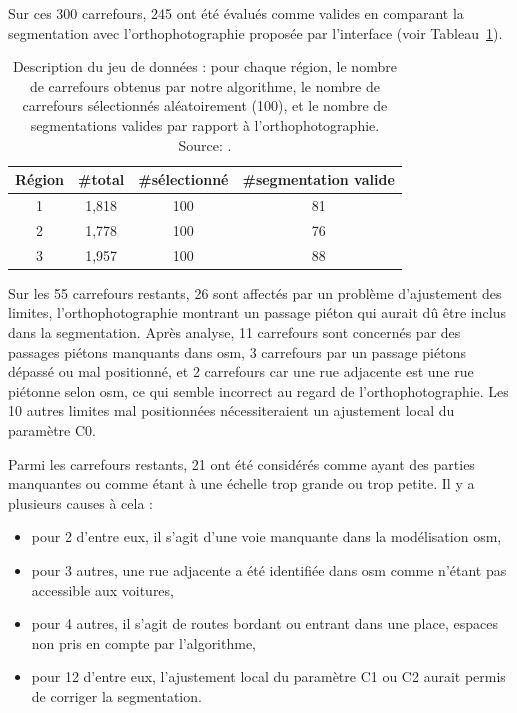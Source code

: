 Sur ces 300 carrefours, 245 ont été évalués comme valides en comparant la segmentation avec l'orthophotographie proposée par l'interface (voir Tableau~\ref{tab:nbRegions}).

\newpar{}

\begin{table}[ht]    
    \centering
    \footnotesize
    \begin{tabular}{c|c|c|c}
         Région & \#total & \#sélectionné & \#segmentation valide \\
         \hline
         1 & 1,818 & 100 & 81 \\
         2 & 1,778 & 100 & 76 \\
         3 & 1,957 & 100 & 88 \\
    \end{tabular}
    \caption{Description du jeu de données : pour chaque région, le nombre de carrefours obtenus par notre algorithme, le nombre de carrefours sélectionnés aléatoirement (100), et le nombre de segmentations valides par rapport à l'orthophotographie. Source: \cite{Favreau2022}.}
    \label{tab:nbRegions}
\end{table}


Sur les 55 carrefours restants, 26 sont affectés par un problème d'ajustement des limites, l'orthophotographie montrant un passage piéton qui aurait dû être inclus dans la segmentation.
Après analyse, 11 carrefours sont concernés par des passages piétons manquants dans \gls{osm}, 3 carrefours par un passage piétons dépassé ou mal positionné, et 2 carrefours car une rue adjacente est une rue piétonne selon \gls{osm}, ce qui semble incorrect au regard de l'orthophotographie. Les 10 autres limites mal positionnées nécessiteraient un ajustement local du paramètre C0.

\newpar{}

Parmi les carrefours restants, 21 ont été considérés comme ayant des parties manquantes ou comme étant à une échelle trop grande ou trop petite. Il y a plusieurs causes à cela : 
\begin{itemize}
    \item pour 2 d'entre eux, il s'agit d'une voie manquante dans la modélisation \gls{osm}, 
    \item pour 3 autres, une rue adjacente a été identifiée dans \gls{osm} comme n'étant pas accessible aux voitures, 
    \item pour 4 autres, il s'agit de routes bordant ou entrant dans une place, espaces non pris en compte par l'algorithme,
    \item pour 12 d'entre eux, l'ajustement local du paramètre C1 ou C2 aurait permis de corriger la segmentation.
\end{itemize}

